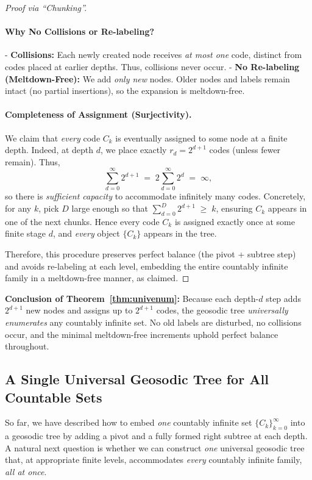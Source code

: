 \documentclass[acmsmall]{acmart}
\theoremstyle{definition}
\theoremstyle{remark}
\begin{document}
\begin{proof}[Proof via ``Chunking'']
\paragraph{Why No Collisions or Re-labeling?}
- \textbf{Collisions:} Each newly created node receives \emph{at most one} code, 
  distinct from codes placed at earlier depths. Thus, collisions never occur.
- \textbf{No Re-labeling (Meltdown-Free):} We add \emph{only new} nodes. 
  Older nodes and labels remain intact (no partial insertions), so the expansion is meltdown-free.

\paragraph{Completeness of Assignment (Surjectivity).}
We claim that \emph{every} code $C_k$ is eventually assigned to some node at a finite depth.
Indeed, at depth $d$, we place exactly $r_d = 2^{d+1}$ codes (unless fewer remain). Thus,
\[
  \sum_{d=0}^{\infty} 2^{d+1} 
  \;=\; 
  2 \sum_{d=0}^{\infty} 2^d 
  \;=\; 
  \infty,
\]
so there is \emph{sufficient capacity} to accommodate infinitely many codes. 
Concretely, for any $k$, pick $D$ large enough so that 
$\sum_{d=0}^D 2^{d+1} \;\ge\; k$, ensuring $C_k$ appears in one of the next chunks. 
Hence every code $C_k$ is assigned exactly once at some finite stage $d$, 
and \emph{every} object $\{C_k\}$ appears in the tree.

\smallskip
\noindent
Therefore, this procedure preserves perfect balance (the pivot + subtree step) 
and avoids re-labeling at each level, embedding the entire countably infinite family 
in a meltdown-free manner, as claimed.
\end{proof}

\noindent
\textbf{Conclusion of Theorem~\ref{thm:univenum}:}
Because each depth-$d$ step adds $2^{d+1}$ new nodes and assigns up to $2^{d+1}$ codes,
the geosodic tree \emph{universally enumerates} any countably infinite set. 
No old labels are disturbed, no collisions occur, and the minimal meltdown-free increments 
uphold perfect balance throughout.

 \subsection{A Single Universal Geosodic Tree for All Countable Sets}
\label{sec:single-geosodic}

So far, we have described how to embed \emph{one} countably infinite set 
$\{C_k\}_{k=0}^\infty$ into a geosodic tree by adding a pivot and a fully formed 
right subtree at each depth. A natural next question is whether we can 
construct \emph{one} universal geosodic tree that, at appropriate finite levels, 
accommodates \emph{every} countably infinite family, \emph{all at once}.
\end{document}
